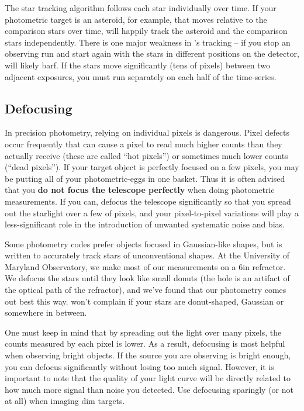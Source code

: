 \documentclass{article}
\begin{document}
The star tracking algorithm follows each star individually over time. If your photometric target is an asteroid, for example, that moves relative to the comparison stars over time, \oscaar will happily track the asteroid and the comparison stars independently. There is one major weakness in \oscaar's tracking -- if you stop an observing run and start again with the stars in different positions on the detector, \oscaar will likely barf. If the stars move significantly (tens of pixels) between two adjacent exposures, you must run \oscaar separately on each half of the time-series.

\subsection{Defocusing} \label{sec:defocusing}

In precision photometry, relying on individual pixels is dangerous. Pixel defects occur frequently that can cause a pixel to read much higher counts than they actually receive (these are called ``hot pixels'') or sometimes much lower counts (``dead pixels''). If your target object is perfectly focused on a few pixels, you may be putting all of your photometric-eggs in one basket. Thus it is often advised that you \textbf{do not focus the telescope perfectly} when doing photometric measurements. If you can, defocus the telescope significantly so that you spread out the starlight over a few of pixels, and your pixel-to-pixel variations will play a less-significant role in the introduction of unwanted systematic noise and bias. 

Some photometry codes prefer objects focused in Gaussian-like shapes, but \oscaar is written to accurately track stars of unconventional shapes. At the University of Maryland Observatory, we make most of our measurements on a 6in refractor. We defocus the stars until they look like small donuts (the hole is an artifact of the optical path of the refractor), and we've found that our photometry comes out best this way. \oscaar won't complain if your stars are donut-shaped, Gaussian or somewhere in between.

One must keep in mind that by spreading out the light over many pixels, the counts measured by each pixel is lower. As a result, defocusing is most helpful when observing bright objects. If the source you are observing is bright enough, you can defocus significantly without losing too much signal. However, it is important to note that the quality of your light curve will be directly related to how much more signal than noise you detected. Use defocusing sparingly (or not at all) when imaging dim targets.
\end{document}
